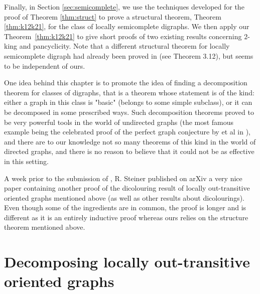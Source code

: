 Finally, in Section \ref{sec:semicomplete}, we use the techniques developed for the proof of Theorem \ref{thm:struct} to prove a structural theorem, Theorem \ref{thm:k12k21}, for the class of locally semicomplete digraphs. We then apply our Theorem~\ref{thm:k12k21} to give short proofs of two existing results concerning $2$-king and pancyclicity. 
Note that a different structural theorem for locally semicomplete digraph had already been proved in \cite{BGGV} (see Theorem 3.12), but seems to be independent of ours.  %

One idea behind this chapter is to promote the idea of finding  a decomposition theorem for classes of digraphs, that is a theorem whose statement is of the kind: either a graph in this class is "basic" (belongs to some simple subclass), or it can be decomposed in some prescribed ways. Such decomposition theorems proved to be very powerful tools in the world of undirected graphs (the most famous example being the celebrated proof of the perfect graph conjecture by \Chu et al in \cite{Perfect}), and there are to our knowledge not so many theorems of this kind in the world of directed graphs, and there is no reason to believe that it could not be as effective in this setting. 

\begin{remark}\label{Steiner}
A week prior to the submission of \cite{AAC21}, R. Steiner published on arXiv a very nice paper \cite{S21} containing another proof of the dicolouring result of locally out-transitive oriented graphs mentioned above (as well as other results about dicolourings). Even though some of the ingredients are in common, the proof is longer and is different as it is an entirely inductive proof whereas ours relies on the structure theorem mentioned above.
\end{remark}





\section{Decomposing locally out-transitive oriented graphs}\label{sec:dec}

